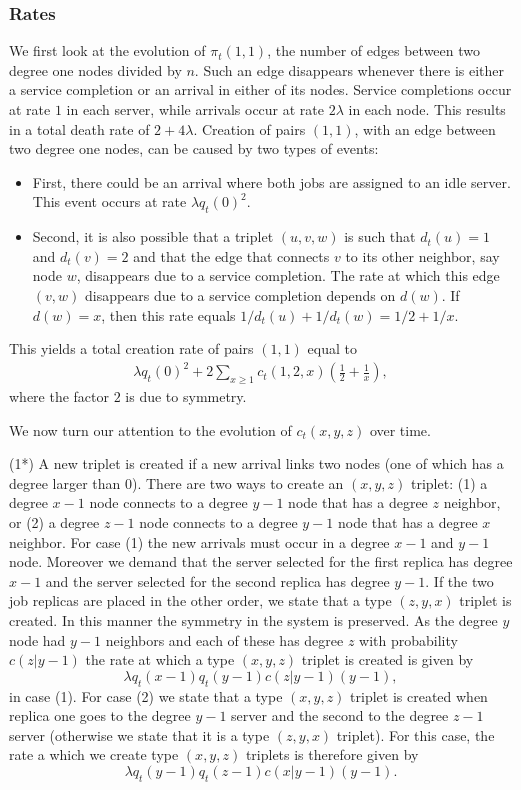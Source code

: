 \documentclass[acmsmall,nonacm]{acmart}
\begin{document}
\subsubsection{Rates}
We first look at the evolution of $\pi_t(1,1)$, the number of edges between two degree one nodes divided by $n$. Such an edge disappears whenever there is either a service completion or an arrival in either of its nodes. Service completions occur at rate $1$ in each server, while arrivals occur at rate $2\lambda$ in each node. This results in a total death rate of $2+4\lambda$. Creation of pairs $(1,1)$, with an edge between two degree one nodes, can be caused by two types of events: 
\begin{itemize}
    \item First, there could be an arrival where both jobs are assigned to an idle server. This event occurs at rate $\lambda q_t(0)^2$.
    \item Second, it is also possible that a triplet $(u,v,w)$ is such that $d_t(u)=1$ and $d_t(v)=2$ and that the edge that connects $v$ to its other neighbor, say node $w$, disappears due to a service completion. The rate at which this edge $(v,w)$ disappears due to a service completion depends on $d(w)$. If $d(w)=x$, then this rate equals $1/d_t(u) + 1/d_t(w) = 1/2+1/x$.
\end{itemize} 
This yields a total creation rate of pairs $(1,1)$ equal to
\begin{align}
    \lambda q_t(0)^2 + 2 \sum_{x\ge1} c_t(1,2,x) \left( \frac{1}{2} + \frac{1}{x}\right),
\end{align}
where the factor $2$ is due to symmetry.

We now turn our attention to the evolution of $c_t(x,y,z)$ over time. 

(1*) A new triplet is created if a new arrival links two nodes (one of which has a degree larger than $0$). There are two ways to create an $(x,y,z)$ triplet: (1) a degree $x-1$ node connects to a degree $y-1$ node that has a degree $z$ neighbor, or (2) a degree $z-1$ node connects to a degree $y-1$ node that has a degree $x$ neighbor. For case (1) the new arrivals must occur in a degree $x-1$ and $y-1$ node. Moreover we demand that the server selected for the first replica has degree $x-1$ and the server selected for the second replica has degree $y-1$. If the two job replicas are placed in the other order, we state that a type $(z,y,x)$ triplet is created. In this manner the symmetry in the system is preserved. As the degree $y$ node had $y-1$ neighbors and each of these has degree $z$ with probability $c(z|y-1)$ the rate at which a type $(x,y,z)$ triplet is created is given by
\[
\lambda q_t(x-1) q_t(y-1) c(z|y-1) (y-1),
\]
in case (1). For case (2) we state that a type $(x,y,z)$ triplet is created when replica one goes to the degree $y-1$ server and the second to the degree $z-1$ server (otherwise we state that it is a type $(z,y,x)$ triplet). For this case, the rate a which we create type $(x,y,z)$ triplets is therefore given by
\[
\lambda q_t(y-1) q_t(z-1) c(x|y-1) (y-1).
\]
\end{document}
